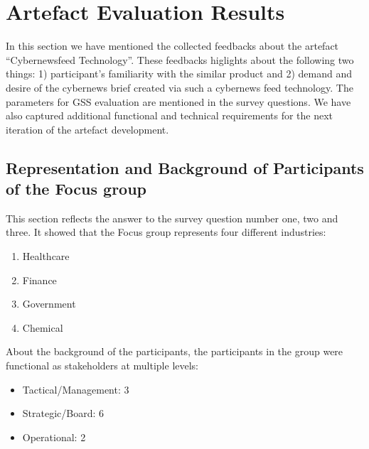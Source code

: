 \section{Artefact Evaluation Results}\label{Artefact Evaluation Results}
In this section we have mentioned the collected feedbacks about the artefact \enquote{Cybernewsfeed Technology}. These feedbacks higlights about the following two things: 1) participant's familiarity with the similar product and 2) demand and desire of the cybernews brief created via such a cybernews feed technology. The parameters for GSS evaluation are mentioned in the survey questions.  We have also captured additional functional and technical requirements for the next iteration of the artefact development.

\subsection{Representation and Background of Participants of the Focus group}
This section reflects the answer to the survey question number one, two and three. It showed that the Focus group represents four different industries:
\begin{enumerate}
    \item Healthcare
    \item Finance
    \item Government
    \item Chemical
\end{enumerate}
 About the background of the participants, the participants in the group were functional as stakeholders at multiple levels:
 \begin{itemize}
     \item Tactical/Management: 3
     \item Strategic/Board: 6
     \item Operational: 2
 \end{itemize}
